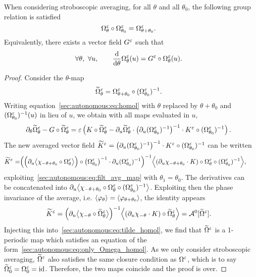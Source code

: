 \begin{proposition} \label{sec:autonomous:prop:phigroup} %
  When considering stroboscopic averaging, for all $\theta$ and all
  $\theta_0$, the following group relation is satisfied 
  $$
    \Omega^{\varepsilon}_{\theta} \circ \Omega^{\varepsilon}_{\theta_0} 
    = \Omega^{\varepsilon}_{\theta + \theta_0}.
  $$
  Equivalently, there exists a vector field $G^{\varepsilon}$ such that 
  $$
  \forall \theta, \ \forall u, \qquad 
  \frac{\mathrm{d}}{\mathrm{d} \theta} \Omega^{\varepsilon}_\theta(u) 
  = G^{\varepsilon} \circ \Omega^{\varepsilon}_\theta(u).
  $$
\end{proposition}
\begin{proof}
Consider the $\theta$-map  
$$
\widetilde \Omega^{\varepsilon}_{\theta} 
= \Omega^{\varepsilon}_{\theta+\theta_0} \circ (\Omega^{\varepsilon}_{\theta_0})^{-1}.
$$
Writing equation~\eqref{sec:autonomous:eq:homol} with $\theta$ replaced by
$\theta+\theta_0$ and $(\Omega^{\varepsilon}_{\theta_0})^{-1}(u)$ in lieu of $u$,
we obtain with all maps evaluated in $u$, 
\begin{equation} \label{sec:autonomous:eq:tilde_homol}
  \partial_\theta \widetilde\Omega^{\varepsilon}_{\theta}
  - G \circ \widetilde \Omega^{\varepsilon}_{\theta}
  = \varepsilon\left( K \circ \widetilde \Omega^{\varepsilon}_{\theta}
    - \partial_u \widetilde \Omega^{\varepsilon}_{\theta} \cdot 
      \left(\partial_u (\Omega^{\varepsilon}_{\theta_0})^{-1} \right)^{-1} \cdot 
      K^{\varepsilon} \circ (\Omega^{\varepsilon}_{\theta_0})^{-1} 
  \right) .
\end{equation}
The new averaged vector field $\widetilde{K}^{\varepsilon} = \left(\partial_u
(\Omega^{\varepsilon}_{\theta_0})^{-1}\right)^{-1} \cdot K^{\varepsilon} \circ
(\Omega^{\varepsilon}_{\theta_0})^{-1} $ can be written 
\begin{align*}
  \widetilde{K}^{\varepsilon} = &
  \Big( \Big( \partial_u \big \langle \chi_{-\theta+\theta_0} 
      \circ \Omega^{\varepsilon} _\theta \big \rangle \Big) 
    \circ \big( \Omega^{\varepsilon}_{\theta_0} \big)^{-1} \cdot
    \partial_u (\Omega^{\varepsilon}_{\theta_0})^{-1} \Big) ^{-1}
  \Big \langle (\partial_u \chi_{-\theta+\theta_0} \cdot K) 
    \circ \Omega^{\varepsilon} _\theta  \circ (\Omega^{\varepsilon}_{\theta_0})^{-1} \Big \rangle ,
\end{align*}
exploiting~\eqref{sec:autonomous:eq:filt_avg_map} with $\theta_1 =
\theta_0$. The derivatives can be concatenated into $\partial_u \big \langle
\chi_{-\theta + \theta_0} \circ \Omega^{\varepsilon} _\theta \circ (\Omega^{\varepsilon}
_{\theta_0})^{-1} \big \rangle$. Exploiting then the phase invariance of the
average, i.e. $\langle \varphi_{\theta} \rangle = \langle \varphi_{\theta + \theta_0}
\rangle$, the identity appears 
\begin{equation*}
  \widetilde{K}^{\varepsilon} =
  \Big( \partial_u \big \langle \chi_{-\theta} 
    \circ \widetilde\Omega^{\varepsilon} _\theta \big \rangle \Big) ^{-1}
  \Big \langle (\partial_u \chi_{-\theta} \cdot K) 
    \circ \widetilde\Omega^{\varepsilon} _\theta \Big \rangle 
  = \mathcal{A}^{0}[\widetilde{\Omega}^{\varepsilon}] .
\end{equation*}
Injecting this into~\eqref{sec:autonomous:eq:tilde_homol}, we find that
$\widetilde{\Omega}^{\varepsilon}$ is a 1-periodic map which satisfies an equation
of the form~\eqref{sec:autonomous:eq:only_Omega_homol}. As we only
consider stroboscopic averaging, $\widetilde{\Omega}^{\varepsilon}$ also satisfies
the same closure condition as $\Omega^{\varepsilon}$, which is to say
$\widetilde\Omega^{\varepsilon} _0 = \Omega^{\varepsilon} _0 = \operatorname{id}$. Therefore, the two maps
coincide and the proof is over. 

\end{proof}
